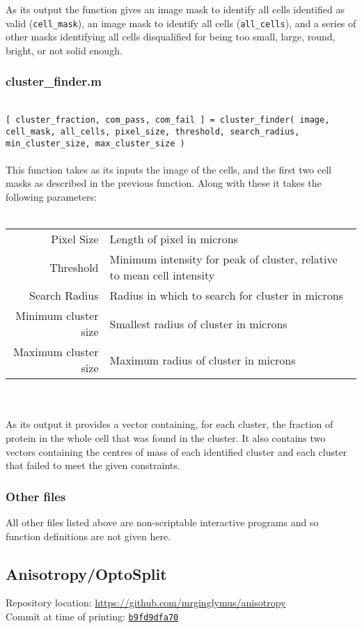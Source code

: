\documentclass[../main.tex]{subfiles}
\begin{document}
As its output the function gives an image mask to identify all cells identified as valid (\texttt{cell\_mask}), an image mask to identify all cells (\texttt{all\_cells}), and a series of other masks identifying all cells disqualified for being too small, large, round, bright, or not solid enough.

\subsubsection{cluster\_finder.m}\ \\
\texttt{[ cluster\_fraction, com\_pass, com\_fail ] = cluster\_finder( image, cell\_mask, all\_cells, pixel\_size, threshold, search\_radius, min\_cluster\_size, max\_cluster\_size ) }
\\\\
This function takes as its inputs the image of the cells, and the first two cell masks as described in the previous function. Along with these it takes the following parameters:
\\\\
\begin{tabular}{rl}
Pixel Size		&	Length of pixel in microns\\
Threshold		&	Minimum intensity for peak of cluster, relative to mean cell intensity\\
Search Radius 	&	Radius in which to search for cluster in microns\\
Minimum cluster size	&	Smallest radius of cluster in microns\\
Maximum cluster size	&	Maximum radius of cluster in microns
\end{tabular}
\\\\
As its output it provides a vector containing, for each cluster, the fraction of protein in the whole cell that was found in the cluster. It also contains two vectors containing the centres of mass of each identified cluster and each cluster that failed to meet the given constraints.

\subsubsection{Other files}
All other files listed above are non-scriptable interactive programs and so function definitions are not given here.


\subsection{Anisotropy/OptoSplit}
\label{sec:scripts:anisotropy}
Repository location: \url{https://github.com/mrginglymus/anisotropy}\\
Commit at time of printing: \href{https://github.com/mrginglymus/anisotropy/tree/b9fd9dfa704d9a8bd9ffa42c45d398bc92c3b660}{\texttt{b9fd9dfa70}}
\end{document}
